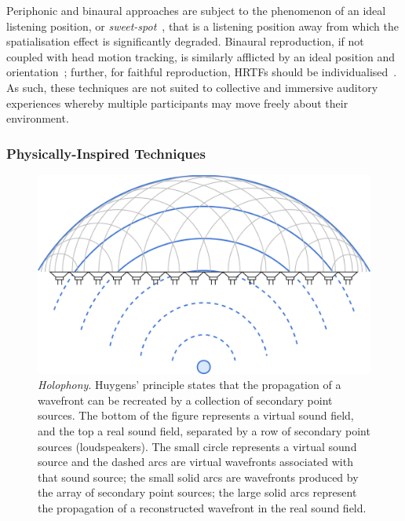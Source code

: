 
Periphonic and binaural approaches are subject to the phenomenon of an ideal
listening position, or \textit{sweet-spot}~\citep{nicol_sound_2017}, that is a
listening position away from which the spatialisation effect is significantly
degraded.
Binaural reproduction, if not coupled with head motion tracking, is similarly
afflicted by an ideal position and orientation~\citep{verheijen_sound_1998};
further, for faithful reproduction, HRTFs should be
individualised~\citep{de_poli_physically_1998}.
As such, these techniques are not suited to collective and immersive auditory
experiences whereby multiple participants may move freely about their
environment.



\subsubsection{Physically-Inspired Techniques}\label{subsubsec:sound-field-synthesis}

\begin{figure}[ht]
    \centering
    \includegraphics[width=.75\textwidth]{figures/wfs_1}
    \caption{\textit{Holophony}.
    Huygens' principle states that the propagation of a wavefront
    can be recreated by a collection of secondary point sources.
    The bottom of the figure represents a virtual sound field, and the top a
    real sound field, separated by a row of secondary point sources
        (loudspeakers).
        The small circle represents a virtual sound source and the dashed arcs
        are virtual wavefronts associated with that sound source;
        the small solid arcs are wavefronts produced by the array of secondary
        point sources;
        the large solid arcs represent the propagation of a reconstructed
        wavefront in the real sound field.}
    \label{fig:wfs_1}
\end{figure}

